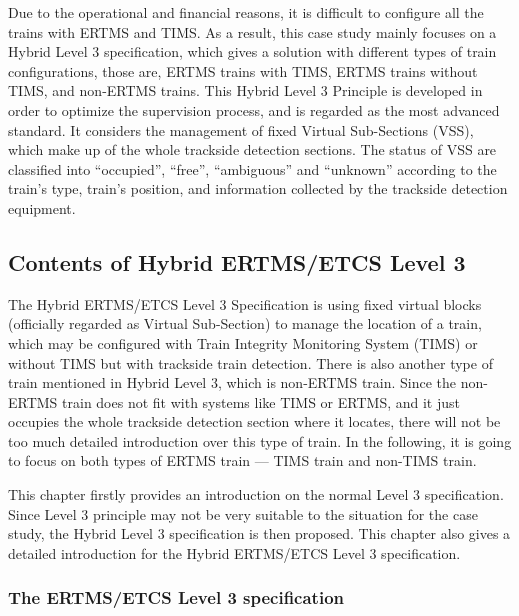 \documentclass[article,dr=phil,type=msc,colorback,accentcolor=tud9c]{tudthesis}
\begin{document}
  Due to the operational and financial reasons, it is difficult to configure all the trains with ERTMS and TIMS. As a result, this case study mainly focuses on a Hybrid Level 3 specification, which gives a solution with different types of train configurations, those are, ERTMS trains with TIMS, ERTMS trains without TIMS, and non-ERTMS trains. This Hybrid Level 3 Principle is developed in order to optimize the supervision process, and is regarded as the most advanced standard. It considers the management of fixed Virtual Sub-Sections (VSS), which make up of the whole trackside detection sections. The status of VSS are classified into ``occupied'', ``free'', ``ambiguous'' and ``unknown'' according to the train's type, train's position, and information collected by the trackside detection equipment.  
    
  \subsection{Contents of Hybrid ERTMS/ETCS Level 3}
  
  The Hybrid ERTMS/ETCS Level 3 Specification is using fixed virtual blocks (officially regarded as Virtual Sub-Section) to manage the location of a train, which may be configured with Train Integrity Monitoring System (TIMS) or without TIMS but with trackside train detection. There is also another type of train mentioned in Hybrid Level 3, which is non-ERTMS train. Since the non-ERTMS train does not fit with systems like TIMS or ERTMS, and it just occupies the whole trackside detection section where it locates, there will not be too much detailed introduction over this type of train. In the following, it is going to focus on both types of ERTMS train --- TIMS train and non-TIMS train.
  
  This chapter firstly provides an introduction on the normal Level 3 specification. Since Level 3 principle may not be very suitable to the situation for the case study, the Hybrid Level 3 specification is then proposed. This chapter also gives a detailed introduction for the Hybrid ERTMS/ETCS Level 3 specification.
  
  \subsubsection{The ERTMS/ETCS Level 3 specification} 
  
\end{document}
